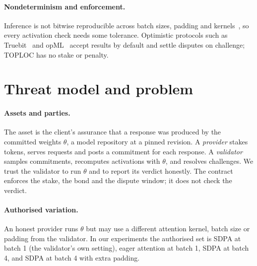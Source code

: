\documentclass[10pt,twocolumn]{article}
\begin{document}
\paragraph{Nondeterminism and enforcement.}
Inference is not bitwise reproducible across batch sizes, padding and kernels~\cite{he2025nondeterminism}, so every activation check needs some tolerance.
Optimistic protocols such as Truebit~\cite{teutsch2019truebit} and opML~\cite{conway2024opml} accept results by default and settle disputes on challenge; TOPLOC has no stake or penalty.

\section{Threat model and problem}
\label{sec:threat}

\paragraph{Assets and parties.}
The asset is the client's assurance that a response was produced by the committed weights $\theta$, a model repository at a pinned revision.
A \emph{provider} stakes tokens, serves requests and posts a commitment for each response.
A \emph{validator} samples commitments, recomputes activations with $\theta$, and resolves challenges.
We trust the validator to run $\theta$ and to report its verdict honestly.
The contract enforces the stake, the bond and the dispute window; it does not check the verdict.

\paragraph{Authorised variation.}
An honest provider runs $\theta$ but may use a different attention kernel, batch size or padding from the validator.
In our experiments the authorised set is SDPA at batch 1 (the validator's own setting), eager attention at batch 1, SDPA at batch 4, and SDPA at batch 4 with extra padding.
\end{document}
